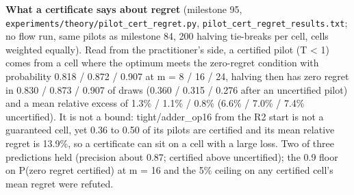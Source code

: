 \documentclass[conference]{IEEEtran}
\begin{document}
\textbf{What a certificate says about regret} (milestone 95,
\texttt{experiments/\allowbreak{}theory/\allowbreak{}pilot\_\allowbreak{}cert\_\allowbreak{}regret.py},
\texttt{pilot\_\allowbreak{}cert\_\allowbreak{}regret\_\allowbreak{}results.txt}; no flow run, same pilots as
milestone 84, 200 halving tie-breaks per cell, cells weighted equally).
Read from the practitioner's side, a certified pilot (T \textless{} 1)
comes from a cell where the optimum meets the zero-regret condition with
probability 0.818 / 0.872 / 0.907 at m = 8 / 16 / 24, halving then has
zero regret in 0.830 / 0.873 / 0.907 of draws (0.360 / 0.315 / 0.276
after an uncertified pilot) and a mean relative excess of 1.3\% / 1.1\%
/ 0.8\% (6.6\% / 7.0\% / 7.4\% uncertified). It is not a bound:
tight/adder\_op16 from the R2 start is not a guaranteed cell, yet 0.36
to 0.50 of its pilots are certified and its mean relative regret is
13.9\%, so a certificate can sit on a cell with a large loss. Two of
three predictions held (precision about 0.87; certified above
uncertified); the 0.9 floor on P(zero regret \textbar{} certified) at m
= 16 and the 5\% ceiling on any certified cell's mean regret were
refuted.
\end{document}
